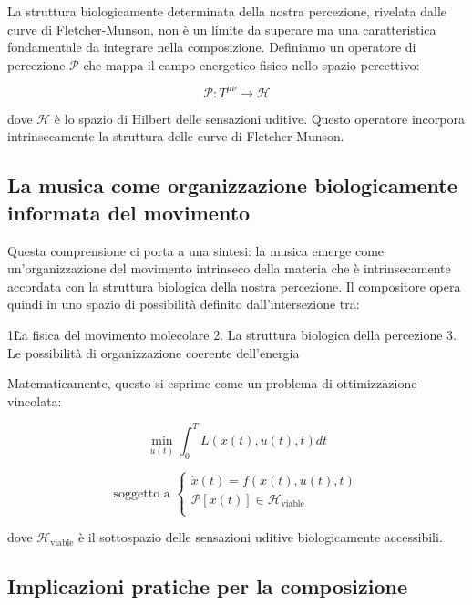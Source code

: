 \documentclass[a4paper,11pt]{article}
\begin{document}
La struttura biologicamente determinata della nostra percezione,
rivelata dalle curve di Fletcher-Munson, non è un limite da superare ma
una caratteristica fondamentale da integrare nella composizione.
Definiamo un operatore di percezione $\mathcal{P}$ che mappa il campo
energetico fisico nello spazio percettivo:

\begin{equation}
\mathcal{P}: T^{\mu\nu} \rightarrow \mathcal{H}
\end{equation}


dove $\mathcal{H}$ è lo spazio di Hilbert delle sensazioni uditive.
Questo operatore incorpora intrinsecamente la struttura delle curve di
Fletcher-Munson.

\subsection{La musica come organizzazione biologicamente informata del movimento}

Questa comprensione ci porta a una sintesi: la musica emerge come
un'organizzazione del movimento intrinseco della materia che è
intrinsecamente accordata con la struttura biologica della nostra
percezione. Il compositore opera quindi in uno spazio di possibilità
definito dall'intersezione tra:

1\. La fisica del movimento molecolare 2. La struttura biologica della
percezione 3. Le possibilità di organizzazione coerente dell'energia

Matematicamente, questo si esprime come un problema di ottimizzazione
vincolata:

\begin{equation}
\min_{u(t)} \int_0^T L(x(t), u(t), t)dt
\end{equation}

$$\text{soggetto a } \begin{cases}
\dot{x}(t) = f(x(t), u(t), t) \\
\mathcal{P}[x(t)] \in \mathcal{H}_{\text{viable}} \\
\end{cases}$$

dove $\mathcal{H}_{\text{viable}}$ è il sottospazio delle sensazioni
uditive biologicamente accessibili.

\subsection{Implicazioni pratiche per la composizione}
\end{document}
